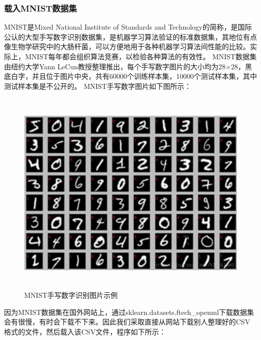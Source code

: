 \documentclass[UTF8]{article}
\begin{document}
\subsubsection{载入MNIST数据集}
MNIST是Mixed National Institute of Standards and Technology的简称，是国际公认的大型手写数字识别数据集，是机器学习算法验证的标准数据集，其地位有点像生物学研究中的大肠杆菌，可以方便地用于各种机器学习算法间性能的比较。实际上，MNIST每年都会组织算法竞赛，以检验各种算法的有效性。\newline
MNIST数据集由纽约大学Yann LeCun教授整理推出，每个手写数字图片的大小均为28$\times$28，黑底白字，并且位于图片中央，共有60000个训练样本集，10000个测试样本集，其中测试样本集是不公开的。\newline
MNIST手写数字图片如下图所示：
\begin{figure}[H]
	\caption{MNIST手写数字识别图片示例}
	\label{f000030}
	\centering
	\includegraphics[height=10cm]{images/f000030}
\end{figure}
因为MNIST数据集在国外网站上，通过sklearn.datasets.ftech\_openml下载数据集会有很慢，有时会下载不下来。因此我们采取直接从网站下载别人整理好的CSV格式的文件，然后载入该CSV文件，程序如下所示：
\end{document}
